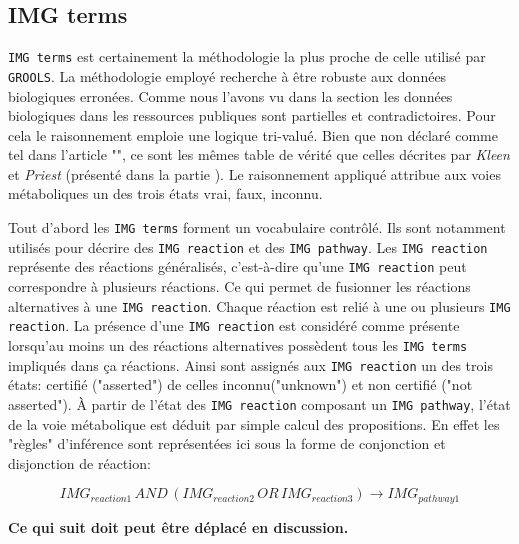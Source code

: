 \begin{refsegment}
    \subsection{IMG terms}
    
    \texttt{IMG terms} \cite{chen2013improving} est certainement la méthodologie la plus proche de celle utilisé par \texttt{GROOLS}. La méthodologie employé recherche à être robuste aux données biologiques  erronées. Comme nous l'avons vu dans la section  les données biologiques dans les ressources publiques sont partielles et contradictoires. Pour cela le raisonnement emploie une logique tri-valué. Bien que non déclaré comme tel dans l'article "", ce sont les mêmes table de vérité que celles décrites par \textit{Kleen} et \textit{Priest} (présenté dans la partie ). Le raisonnement appliqué attribue aux voies métaboliques un des trois états vrai, faux, inconnu.
    
    Tout d'abord les \texttt{IMG terms} forment un vocabulaire contrôlé. Ils sont notamment utilisés pour décrire des \texttt{IMG reaction}  et des \texttt{IMG pathway}. Les \texttt{IMG reaction} représente des réactions généralisés, c'est-à-dire qu'une \texttt{IMG reaction} peut correspondre à plusieurs réactions. Ce qui permet de fusionner les réactions alternatives à une \texttt{IMG reaction}. Chaque réaction est relié à une ou plusieurs \texttt{IMG reaction}. La présence d'une \texttt{IMG reaction} est considéré comme présente lorsqu'au moins un des réactions alternatives possèdent tous les \texttt{IMG terms} impliqués dans ça réactions. Ainsi sont assignés aux \texttt{IMG reaction} un des trois états: certifié ("asserted") de celles inconnu("unknown") et non certifié ("not asserted"). À partir de l'état des \texttt{IMG reaction} composant un  \texttt{IMG pathway}, l'état de la voie métabolique est déduit par simple calcul des propositions. En effet les "règles" d'inférence sont représentées ici sous la forme de conjonction et disjonction de réaction:
    
    \begin{equation}
        IMG_{reaction1} \, AND \, (IMG_{reaction2} \, OR \, IMG_{reaction3} ) \to IMG_{pathway 1}
    \end{equation}
    
    \textbf{Ce qui suit doit peut être déplacé en discussion.}
    

\end{refsegment}
